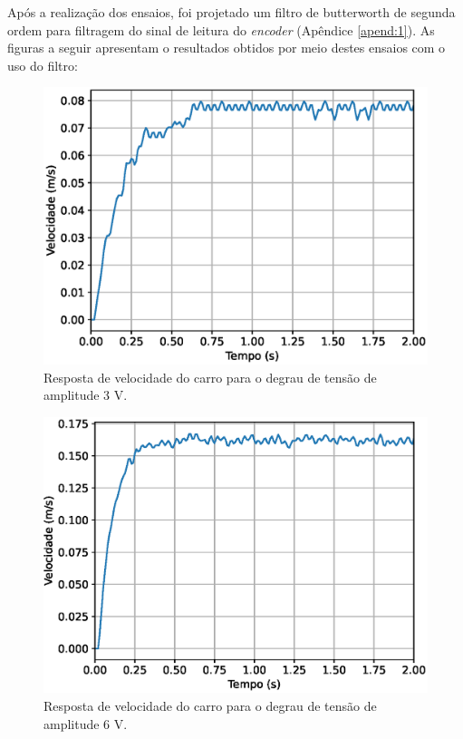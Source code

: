 Após a realização dos ensaios, foi projetado um filtro de butterworth de segunda ordem para filtragem do sinal de leitura do \textit{encoder} (Apêndice \ref{apend:1}). As figuras a seguir apresentam o resultados obtidos por meio destes ensaios com o uso do filtro:

\begin{figure}[H]
    \centering
    \includegraphics[width=0.8\linewidth]{figuras/degrau_3V.eps}
    \caption[Resposta de velocidade do carro para o degrau de tensão de amplitude 3 V]{Resposta de velocidade do carro para o degrau de tensão de amplitude 3 V.}
    \label{fig:resp_degrau3}
\end{figure}

\begin{figure}[H]
    \centering
    \includegraphics[width=0.8\linewidth]{figuras/degrau_6V.eps}
    \caption[Resposta de velocidade do carro para o degrau de tensão de amplitude 6 V]{Resposta de velocidade do carro para o degrau de tensão de amplitude 6 V.}
    \label{fig:resp_degrau6}
\end{figure}

